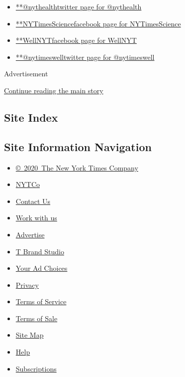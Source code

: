 \begin{itemize}
\tightlist
\item
  \href{https://twitter.com/nythealth}{**@nythealthtwitter page for
  @nythealth}
\item
  \href{https://www.facebook.com/NYTimesScience}{**NYTimesSciencefacebook
  page for NYTimesScience}
\item
  \href{https://www.facebook.com/WellNYT}{**WellNYTfacebook page for
  WellNYT}
\item
  \href{https://twitter.com/nytimeswell}{**@nytimeswelltwitter page for
  @nytimeswell}
\end{itemize}

Advertisement

\protect\hyperlink{after-mktg}{Continue reading the main story}

\hypertarget{site-index}{%
\subsection{Site Index}\label{site-index}}

\hypertarget{site-information-navigation}{%
\subsection{Site Information
Navigation}\label{site-information-navigation}}

\begin{itemize}
\tightlist
\item
  \href{https://help.nytimes.com/hc/en-us/articles/115014792127-Copyright-notice}{©~2020~The
  New York Times Company}
\end{itemize}

\begin{itemize}
\tightlist
\item
  \href{https://www.nytco.com/}{NYTCo}
\item
  \href{https://help.nytimes.com/hc/en-us/articles/115015385887-Contact-Us}{Contact
  Us}
\item
  \href{https://www.nytco.com/careers/}{Work with us}
\item
  \href{https://nytmediakit.com/}{Advertise}
\item
  \href{http://www.tbrandstudio.com/}{T Brand Studio}
\item
  \href{https://www.nytimes.com/privacy/cookie-policy\#how-do-i-manage-trackers}{Your
  Ad Choices}
\item
  \href{https://www.nytimes.com/privacy}{Privacy}
\item
  \href{https://help.nytimes.com/hc/en-us/articles/115014893428-Terms-of-service}{Terms
  of Service}
\item
  \href{https://help.nytimes.com/hc/en-us/articles/115014893968-Terms-of-sale}{Terms
  of Sale}
\item
  \href{https://spiderbites.nytimes.com}{Site Map}
\item
  \href{https://help.nytimes.com/hc/en-us}{Help}
\item
  \href{https://www.nytimes.com/subscription?campaignId=37WXW}{Subscriptions}
\end{itemize}
